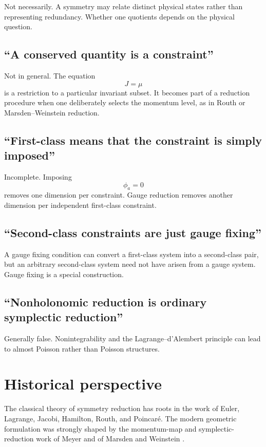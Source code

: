 \documentclass[11pt,a4paper]{article}
\theoremstyle{definition}
\begin{document}
Not necessarily.  A symmetry may relate distinct physical states rather than
representing redundancy.  Whether one quotients depends on the physical
question.

\subsection{``A conserved quantity is a constraint''}

Not in general.  The equation
\[
        J=\mu
\]
is a restriction to a particular invariant subset.  It becomes part of a
reduction procedure when one deliberately selects the momentum level, as in
Routh or Marsden--Weinstein reduction.

\subsection{``First-class means that the constraint is simply imposed''}

Incomplete.  Imposing
\[
        \phi_a=0
\]
removes one dimension per constraint.  Gauge reduction removes another
dimension per independent first-class constraint.

\subsection{``Second-class constraints are just gauge fixing''}

A gauge fixing condition can convert a first-class system into a second-class
pair, but an arbitrary second-class system need not have arisen from a gauge
system.  Gauge fixing is a special construction.

\subsection{``Nonholonomic reduction is ordinary symplectic reduction''}

Generally false.  Nonintegrability and the Lagrange--d'Alembert principle can
lead to almost Poisson rather than Poisson structures.

\section{Historical perspective}

The classical theory of symmetry reduction has roots in the work of Euler,
Lagrange, Jacobi, Hamilton, Routh, and Poincaré.  The modern geometric
formulation was strongly shaped by the momentum-map and symplectic-reduction
work of Meyer and of Marsden and Weinstein
\cite{Meyer1973,MarsdenWeinstein1974}.
\end{document}
